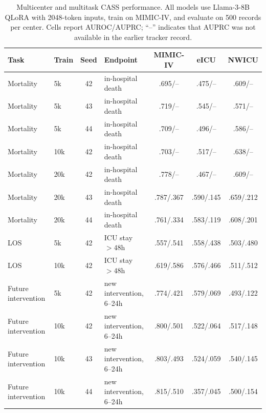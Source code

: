 \begin{table}[t]
\caption{Multicenter and multitask CASS performance. All models use Llama-3-8B QLoRA with 2048-token inputs, train on MIMIC-IV, and evaluate on 500 records per center. Cells report AUROC/AUPRC; ``--'' indicates that AUPRC was not available in the earlier tracker record.}
\label{tab:main_results}
\centering
\scriptsize
\setlength{\tabcolsep}{3.2pt}
\begin{tabular}{llclccc}
\toprule
Task & Train & Seed & Endpoint & MIMIC-IV & eICU & NWICU \\
\midrule
Mortality & 5k  & 42 & in-hospital death & .695/-- & .475/-- & .609/-- \\
Mortality & 5k  & 43 & in-hospital death & .719/-- & .545/-- & .571/-- \\
Mortality & 5k  & 44 & in-hospital death & .709/-- & .496/-- & .586/-- \\
Mortality & 10k & 42 & in-hospital death & .703/-- & .517/-- & .638/-- \\
Mortality & 20k & 42 & in-hospital death & .778/-- & .467/-- & .609/-- \\
Mortality & 20k & 43 & in-hospital death & .787/.367 & .590/.145 & .659/.212 \\
Mortality & 20k & 44 & in-hospital death & .761/.334 & .583/.119 & .608/.201 \\
\midrule
LOS & 5k  & 42 & ICU stay $>48$h & .557/.541 & .558/.438 & .503/.480 \\
LOS & 10k & 42 & ICU stay $>48$h & .619/.586 & .576/.466 & .511/.512 \\
\midrule
Future intervention & 5k  & 42 & new intervention, 6--24h & .774/.421 & .579/.069 & .493/.122 \\
Future intervention & 10k & 42 & new intervention, 6--24h & .800/.501 & .522/.064 & .517/.148 \\
Future intervention & 10k & 43 & new intervention, 6--24h & .803/.493 & .524/.059 & .540/.145 \\
Future intervention & 10k & 44 & new intervention, 6--24h & .815/.510 & .357/.045 & .500/.154 \\
\bottomrule
\end{tabular}
\end{table}

